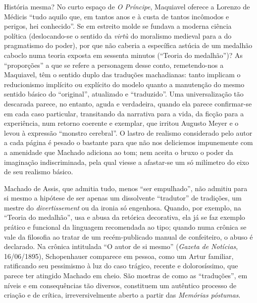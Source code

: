 História mesma? No curto espaço de \emph{O Príncipe}, Maquiavel oferece
a Lorenzo de Médicis ``tudo aquilo que, em tantos anos e à custa de
tantos incômodos e perigos, hei conhecido''. Se em estreito molde se
fundava a moderna ciência política (deslocando-se o sentido da
\emph{virtù} do moralismo medieval para a do pragmatismo do poder), por
que não caberia a específica astúcia de um medalhão caboclo numa teoria
exposta em sessenta minutos (``Teoria do medalhão'')? As ``proporções''
a que se refere a personagem desse conto, remetendo-nos a Maquiavel, têm
o sentido duplo das traduções machadianas: tanto implicam o reducionismo
implícito ou explícito do modelo quanto a manutenção do mesmo sentido
básico do ``original'', atualizado e ``traduzido''. Uma universalização
tão descarada parece, no entanto, aguda e verdadeira, quando ela parece
confirmar-se em cada caso particular, transitando da narrativa para a
vida, da ficção para a experiência, num retorno coerente e exemplar, que
irritou Augusto Meyer e o levou à expressão ``monstro cerebral''. O
lastro de realismo considerado pelo autor a cada página é pesado o
bastante para que não nos deliciemos impunemente com a amenidade que
Machado adiciona ao tom; nem aceita o bruxo o poder da imaginação
indiscriminada, pela qual viesse a afastar-se um só milímetro do eixo de
seu realismo básico.

Machado de Assis, que admitia tudo, menos ``ser empulhado'', não admitiu
para si mesmo a hipótese de ser apenas um dissolvente ``tradutor'' de
tradições, um mestre do \emph{divertissement} ou da ironia só engenhosa.
Quando, por exemplo, na ``Teoria do medalhão'', usa e abusa da retórica
decorativa, ela já se faz exemplo prático e funcional da linguagem
recomendada ao tipo; quando numa crônica se vale da filosofia ao tratar
de um recém-publicado manual de confeiteiro, o abuso é declarado. Na
crônica intitulada ``O autor de si mesmo'' (\emph{Gazeta de Notícias},
16/06/1895), Schopenhauer comparece em pessoa, como um Artur familiar,
ratificando seu pessimismo à luz do caso trágico, recente e
dolorosíssimo, que parece ter atingido Machado em cheio. São mostras de
como as ``traduções'', em níveis e em consequências tão diversos,
constituem um autêntico processo de criação e de crítica,
irreversivelmente aberto a partir das \emph{Memórias póstumas}.

